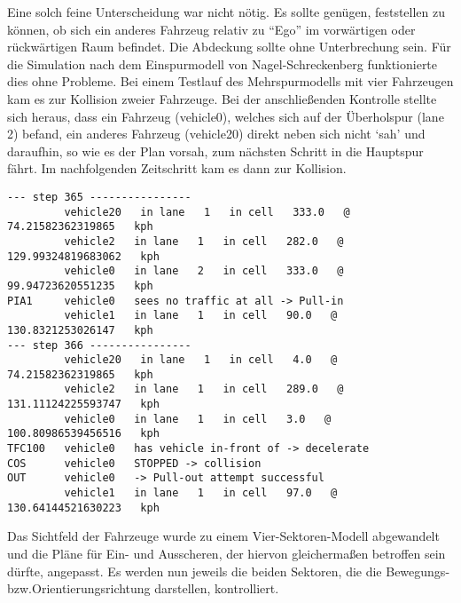 Eine solch feine Unterscheidung war nicht nötig.
Es sollte genügen, feststellen zu können, ob sich ein anderes Fahrzeug relativ zu \enquote{Ego} im vorwärtigen oder rückwärtigen Raum befindet. 
Die Abdeckung sollte ohne Unterbrechung sein.
Für die Simulation nach dem Einspurmodell von Nagel-Schreckenberg funktionierte dies ohne Probleme.
Bei einem Testlauf des Mehrspurmodells mit vier Fahrzeugen kam es zur Kollision zweier Fahrzeuge. 
Bei der anschließenden Kontrolle stellte sich heraus, dass ein Fahrzeug (vehicle0), welches sich auf der Überholspur (lane 2) befand, ein anderes Fahrzeug (vehicle20) direkt neben sich nicht \enquote*{sah} und daraufhin, so wie es der Plan vorsah, zum nächsten Schritt in die Hauptspur fährt. 
Im nachfolgenden Zeitschritt kam es dann zur Kollision.

\begin{verbatim}
--- step 365 ----------------
         vehicle20   in lane   1   in cell   333.0   @   74.21582362319865   kph
         vehicle2   in lane   1   in cell   282.0   @   129.99324819683062   kph
         vehicle0   in lane   2   in cell   333.0   @   99.94723620551235   kph
PIA1     vehicle0   sees no traffic at all -> Pull-in
         vehicle1   in lane   1   in cell   90.0   @   130.8321253026147   kph
--- step 366 ----------------
         vehicle20   in lane   1   in cell   4.0   @   74.21582362319865   kph
         vehicle2   in lane   1   in cell   289.0   @   131.11124225593747   kph
         vehicle0   in lane   1   in cell   3.0   @   100.80986539456516   kph
TFC100   vehicle0   has vehicle in-front of -> decelerate
COS      vehicle0   STOPPED -> collision
OUT      vehicle0   -> Pull-out attempt successful
         vehicle1   in lane   1   in cell   97.0   @   130.64144521630223   kph
\end{verbatim}

Das Sichtfeld der Fahrzeuge wurde zu einem Vier-Sektoren-Modell abgewandelt und die Pläne für Ein- und Ausscheren, der hiervon gleichermaßen betroffen sein dürfte, angepasst.
Es werden nun jeweils die beiden Sektoren, die die Bewegungs- bzw.Orientierungsrichtung darstellen, kontrolliert.